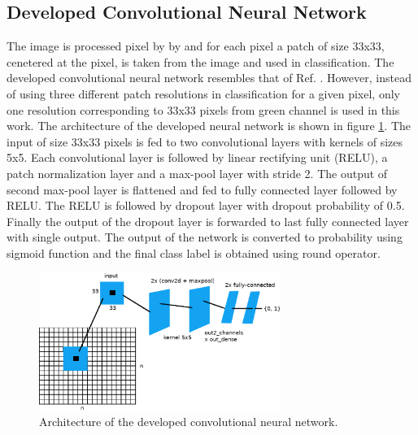 \documentclass[aps,prb,10pt,twocolumn,groupedaddress]{revtex4-1}
\begin{document}
\subsection{Developed Convolutional Neural Network}
\label{sec:computational_methods_developed_network}
The image is processed pixel by by and for each pixel a patch of size 33x33, cenetered at the pixel, is taken from the image and used in classification.
The developed convolutional neural network resembles that of Ref. \cite{tan}. However, instead of using three different patch resolutions in classification for a given pixel, only one resolution corresponding to 33x33 pixels from green channel is used in this work. The architecture of the developed neural network is shown in figure \ref{fig:net}. 
The input of size 33x33 pixels is fed to two convolutional layers with kernels of sizes 5x5. Each convolutional layer is followed by linear rectifying unit (RELU), a patch normalization layer and a max-pool layer with stride 2. The output of second max-pool layer is flattened and fed to fully connected layer followed by RELU. The RELU is followed by dropout layer with dropout probability of 0.5. Finally the output of the dropout layer is forwarded to last fully connected layer with single output. The output of the network is converted to probability using sigmoid function and the final class label is obtained using round operator.
\begin{figure}[]
	\centering
	\includegraphics[width=0.7\textwidth]{images/net_cropped.eps}
	\caption{Architecture of the developed convolutional neural network.}
	\label{fig:net}
\end{figure}
\end{document}
